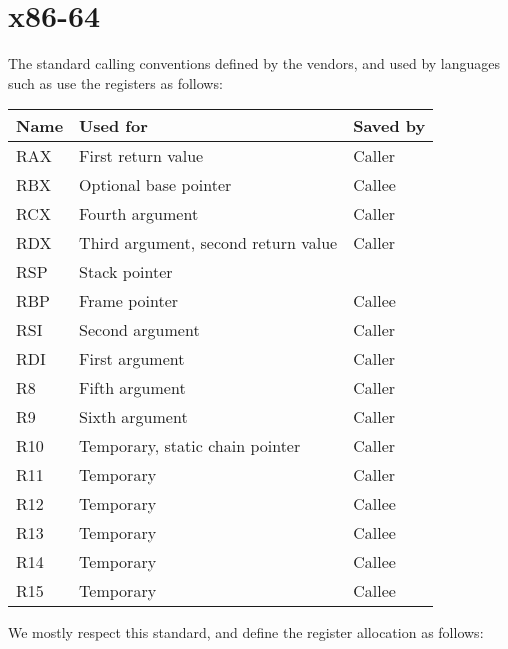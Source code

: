 \chapter{x86-64}
\label{chapter-backend-x86-64}

The standard calling conventions defined by the vendors, and used by
languages such as \clanguage{} use the registers as follows:

\begin{tabular}{|l|l|l|}
\hline
Name & Used for & Saved by\\
\hline
\hline
RAX & First return value & Caller\\
RBX & Optional base pointer & Callee\\
RCX & Fourth argument & Caller \\
RDX & Third argument, second return value & Caller\\
RSP & Stack pointer &\\
RBP & Frame pointer & Callee\\
RSI & Second argument & Caller\\
RDI & First argument & Caller\\
R8 & Fifth argument & Caller\\
R9 & Sixth argument & Caller\\
R10 & Temporary, static chain pointer & Caller\\
R11 & Temporary & Caller\\
R12 & Temporary & Callee\\
R13 & Temporary & Callee\\
R14 & Temporary & Callee\\
R15 & Temporary & Callee\\
\hline
\end{tabular}

We mostly respect this standard, and define the register allocation as
follows:

